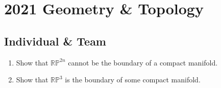 \section{2021 Geometry \& Topology}

\subsection{Individual \& Team}

\begin{exercise}
\label{geometry:2021:1}
\begin{enumerate}
    \item[(a)] Show that $\mathbb{RP}^{2n}$ cannot be the boundary of a compact manifold.
    \item[(b)] Show that $\mathbb{RP}^{3}$ is the boundary of some compact manifold.
\end{enumerate}
\end{exercise}


